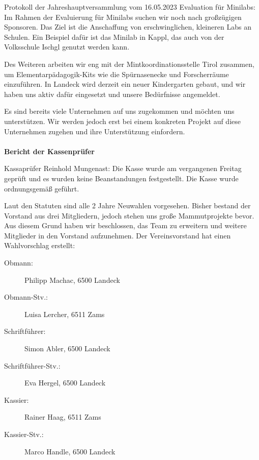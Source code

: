 \documentclass{scrartcl}
\begin{document}
\begin{Minutes}{Protokoll der Jahreshauptversammlung vom 16.05.2023}
  Evaluation für Minilabs:
  Im Rahmen der Evaluierung für Minilabs suchen wir noch nach großzügigen Sponsoren. Das Ziel ist die Anschaffung von erschwinglichen, kleineren Labs an Schulen. Ein Beispiel dafür ist das Minilab in Kappl, das auch von der Volksschule Ischgl genutzt werden kann.

  Des Weiteren arbeiten wir eng mit der Mintkoordinationsstelle Tirol zusammen, um Elementarpädagogik-Kits wie die Spürnasenecke und Forscherräume einzuführen. In Landeck wird derzeit ein neuer Kindergarten gebaut, und wir haben uns aktiv dafür eingesetzt und unsere Bedürfnisse angemeldet.
  
  Es sind bereits viele Unternehmen auf uns zugekommen und möchten uns unterstützen. Wir werden jedoch erst bei einem konkreten Projekt auf diese Unternehmen zugehen und ihre Unterstützung einfordern.\\\\
  \textbf{Bericht der Kassenprüfer}

  Kassaprüfer Reinhold Mungenast: \glqq Die Kasse wurde am vergangenen Freitag geprüft und es wurden keine Beanstandungen festgestellt. Die Kasse wurde ordnungsgemäß geführt.\grqq{}



  Laut den Statuten sind alle 2 Jahre Neuwahlen vorgesehen. Bisher bestand der Vorstand aus drei Mitgliedern, jedoch stehen uns große Mammutprojekte bevor. Aus diesem Grund haben wir beschlossen, das Team zu erweitern und weitere Mitglieder in den Vorstand aufzunehmen.
  Der Vereinsvorstand hat einen Wahlvorschlag erstellt:
  
  \begin{description}
    \item[Obmann:] Philipp Machac, 6500 Landeck
    \item[Obmann-Stv.:] Luisa Lercher, 6511 Zams
    \item[Schriftführer:] Simon Abler, 6500 Landeck
    \item[Schriftführer-Stv.:] Eva Hergel, 6500 Landeck
    \item[Kassier:] Rainer Haag, 6511 Zams
    \item[Kassier-Stv.:] Marco Handle, 6500 Landeck
  \end{description}



\end{Minutes}
\end{document}
